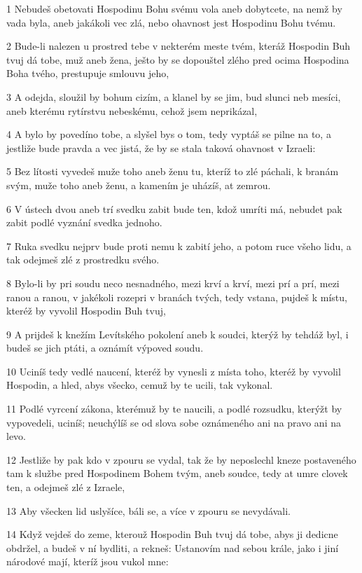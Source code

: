 \par 1 Nebudeš obetovati Hospodinu Bohu svému vola aneb dobytcete, na nemž by vada byla, aneb jakákoli vec zlá, nebo ohavnost jest Hospodinu Bohu tvému.
\par 2 Bude-li nalezen u prostred tebe v nekterém meste tvém, kteráž Hospodin Buh tvuj dá tobe, muž aneb žena, ješto by se dopouštel zlého pred ocima Hospodina Boha tvého, prestupuje smlouvu jeho,
\par 3 A odejda, sloužil by bohum cizím, a klanel by se jim, bud slunci neb mesíci, aneb kterému rytírstvu nebeskému, cehož jsem neprikázal,
\par 4 A bylo by povedíno tobe, a slyšel bys o tom, tedy vyptáš se pilne na to, a jestliže bude pravda a vec jistá, že by se stala taková ohavnost v Izraeli:
\par 5 Bez lítosti vyvedeš muže toho aneb ženu tu, kteríž to zlé páchali, k branám svým, muže toho aneb ženu, a kamením je uházíš, at zemrou.
\par 6 V ústech dvou aneb trí svedku zabit bude ten, kdož umríti má, nebudet pak zabit podlé vyznání svedka jednoho.
\par 7 Ruka svedku nejprv bude proti nemu k zabití jeho, a potom ruce všeho lidu, a tak odejmeš zlé z prostredku svého.
\par 8 Bylo-li by pri soudu neco nesnadného, mezi krví a krví, mezi prí a prí, mezi ranou a ranou, v jakékoli rozepri v branách tvých, tedy vstana, pujdeš k místu, kteréž by vyvolil Hospodin Buh tvuj,
\par 9 A prijdeš k knežím Levítského pokolení aneb k soudci, kterýž by tehdáž byl, i budeš se jich ptáti, a oznámít výpoved soudu.
\par 10 Uciníš tedy vedlé naucení, kteréž by vynesli z místa toho, kteréž by vyvolil Hospodin, a hled, abys všecko, cemuž by te ucili, tak vykonal.
\par 11 Podlé vyrcení zákona, kterémuž by te naucili, a podlé rozsudku, kterýžt by vypovedeli, uciníš; neuchýlíš se od slova sobe oznámeného ani na pravo ani na levo.
\par 12 Jestliže by pak kdo v zpouru se vydal, tak že by neposlechl kneze postaveného tam k službe pred Hospodinem Bohem tvým, aneb soudce, tedy at umre clovek ten, a odejmeš zlé z Izraele,
\par 13 Aby všecken lid uslyšíce, báli se, a více v zpouru se nevydávali.
\par 14 Když vejdeš do zeme, kterouž Hospodin Buh tvuj dá tobe, abys ji dedicne obdržel, a budeš v ní bydliti, a rekneš: Ustanovím nad sebou krále, jako i jiní národové mají, kteríž jsou vukol mne:
